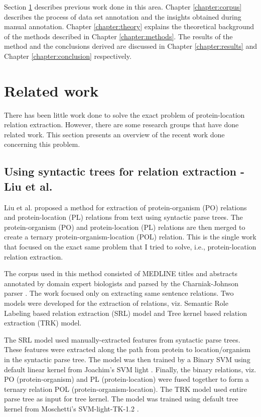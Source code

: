 Section \ref{sec:existingWork} describes previous work done in this area. Chapter \ref{chapter:corpus} describes the process of data set annotation and the insights obtained during manual annotation. Chapter \ref{chapter:theory} explains the theoretical background of the methods described in Chapter \ref{chapter:methods}. The results of the method and the conclusions derived are discussed in Chapter \ref{chapter:results} and Chapter \ref{chapter:conclusion} respectively.

\section{Related work}\label{sec:existingWork}

There has been little work done to solve the exact problem of protein-location relation extraction. However, there are some research groups that have done related work. This section presents an overview of the recent work done concerning this problem.

\subsection{Using syntactic trees for relation extraction - Liu et al.}

Liu et al. \cite{liu2007exploiting} proposed a method for extraction of protein-organism (PO) relations and protein-location (PL) relations from text using syntactic parse trees. The protein-organism (PO) and protein-location (PL) relations are then merged to create a ternary protein-organism-location (POL) relation. This is the single work that focused on the exact same problem that I tried to solve, i.e., protein-location relation extraction.

The corpus used in this method consisted of MEDLINE titles and abstracts annotated by domain expert biologists and parsed by the Charniak-Johnson parser \cite{charniak2006multilevel}. The work focused only on extracting same sentence relations. Two models were developed for the extraction of relations, viz. Semantic Role Labeling based relation extraction (SRL) model and Tree kernel based relation extraction (TRK) model. 

The SRL model used manually-extracted features from syntactic parse trees. These features were extracted along the path from protein to location/organism in the syntactic parse tree. The model was then trained by a Binary SVM using default linear kernel from Joachim’s SVM light \cite{joachims1999making}. Finally, the binary relations, viz. PO (protein-organism) and PL (protein-location) were fused together to form a ternary relation POL (protein-organism-location). The TRK model used entire parse tree as input for tree kernel. The model was trained using default tree kernel from Moschetti’s SVM-light-TK-1.2 \cite{moschitti2004study}. 

